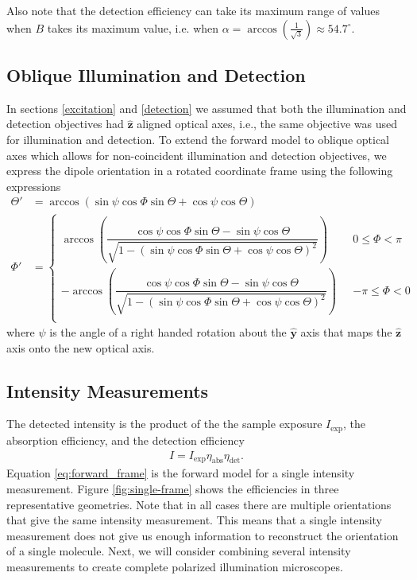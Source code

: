 \documentclass[10pt]{article}
\providecommand{\mh}[1]{\mathbf{\hat{#1}}}
\begin{document}
Also note that the detection efficiency can take its maximum range of values
when $B$ takes its maximum value, i.e. when
$\alpha=\arccos\left(\frac{1}{\sqrt{3}}\right) \approx 54.7^{\circ}$. 

\subsection{Oblique Illumination and Detection}\label{oblique}
In sections \ref{excitation} and \ref{detection} we assumed that both the
illumination and detection objectives had $\mh{z}$ aligned optical axes, i.e.,
the same objective was used for illumination and detection. To extend the
forward model to oblique optical axes which allows for non-coincident
illumination and detection objectives, we express the dipole orientation in a
rotated coordinate frame using the following expressions
\begin{align}
    \Theta' &= \arccos\left(\sin\psi\cos\Phi\sin\Theta + \cos\psi\cos\Theta\right)\label{eq:thetap}\\
  \Phi' &=
          \begin{cases}
            \arccos\left(\dfrac{\cos\psi\cos\Phi\sin\Theta - \sin\psi\cos\Theta}{\sqrt{1 - (\sin\psi\cos\Phi\sin\Theta + \cos\psi\cos\Theta)^2}}\right) \ \ \ &0 \leq \Phi < \pi  \\
            -\arccos\left(\dfrac{\cos\psi\cos\Phi\sin\Theta - \sin\psi\cos\Theta}{\sqrt{1 - (\sin\psi\cos\Phi\sin\Theta + \cos\psi\cos\Theta)^2}}\right) \ \ \ &-\pi \leq \Phi < 0\\
          \end{cases}
\end{align}
where $\psi$ is the angle of a right handed rotation about the $\mh{y}$ axis
that maps the $\mh{z}$ axis onto the new optical axis.

\subsection{Intensity Measurements}\label{forward}
The detected intensity is the product of the the sample exposure
$I_{\text{exp}}$, the absorption efficiency, and the detection efficiency
\begin{align}
  I = I_{\text{exp}}\eta_{\text{abs}}\eta_{\text{det}}\label{eq:forward_frame}.
\end{align}
Equation \ref{eq:forward_frame} is the forward model for a single intensity
measurement. Figure \ref{fig:single-frame} shows the efficiencies in three
representative geometries. Note that in all cases there are multiple
orientations that give the same intensity measurement. This means that a single
intensity measurement does not give us enough information to reconstruct the
orientation of a single molecule. Next, we will consider combining several
intensity measurements to create complete polarized illumination microscopes.
\end{document}
